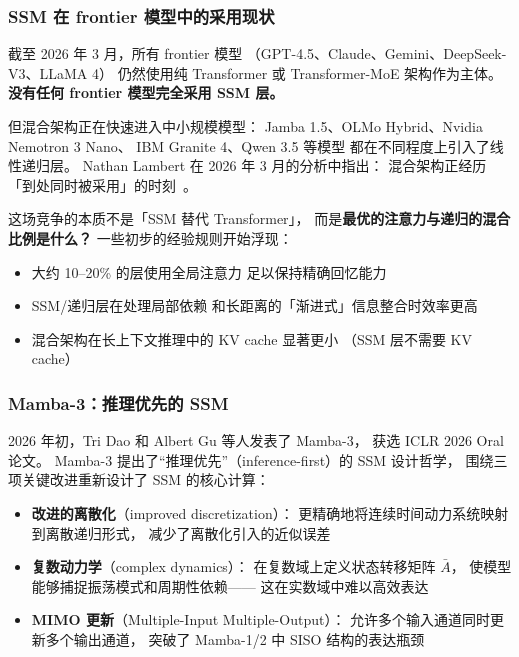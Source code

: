 \subsubsection{SSM 在 frontier 模型中的采用现状}

截至 2026 年 3 月，所有 frontier 模型
（GPT-4.5、Claude、Gemini、DeepSeek-V3、LLaMA 4）
仍然使用纯 Transformer 或 Transformer-MoE 架构作为主体。
\textbf{没有任何 frontier 模型完全采用 SSM 层。}

但混合架构正在快速进入中小规模模型：
Jamba 1.5、OLMo Hybrid、Nvidia Nemotron 3 Nano、
IBM Granite 4、Qwen 3.5 等模型
都在不同程度上引入了线性递归层。
Nathan Lambert 在 2026 年 3 月的分析中指出：
混合架构正经历「到处同时被采用」的时刻~\cite{lambert2026hybrid}。

这场竞争的本质不是「SSM 替代 Transformer」，
而是\textbf{最优的注意力与递归的混合比例是什么？}
一些初步的经验规则开始浮现：
\begin{itemize}[noitemsep]
  \item 大约 10--20\% 的层使用全局注意力
        足以保持精确回忆能力
  \item SSM/递归层在处理局部依赖
        和长距离的「渐进式」信息整合时效率更高
  \item 混合架构在长上下文推理中的 KV cache 显著更小
        （SSM 层不需要 KV cache）
\end{itemize}

\subsubsection{Mamba-3：推理优先的 SSM}

2026 年初，Tri Dao 和 Albert Gu 等人发表了 Mamba-3，
获选 ICLR 2026 Oral 论文。
Mamba-3 提出了``推理优先''（inference-first）的 SSM 设计哲学，
围绕三项关键改进重新设计了 SSM 的核心计算：

\begin{itemize}[noitemsep]
  \item \textbf{改进的离散化}（improved discretization）：
        更精确地将连续时间动力系统映射到离散递归形式，
        减少了离散化引入的近似误差
  \item \textbf{复数动力学}（complex dynamics）：
        在复数域上定义状态转移矩阵 $\bar{A}$，
        使模型能够捕捉振荡模式和周期性依赖——
        这在实数域中难以高效表达
  \item \textbf{MIMO 更新}（Multiple-Input Multiple-Output）：
        允许多个输入通道同时更新多个输出通道，
        突破了 Mamba-1/2 中 SISO 结构的表达瓶颈
\end{itemize}

